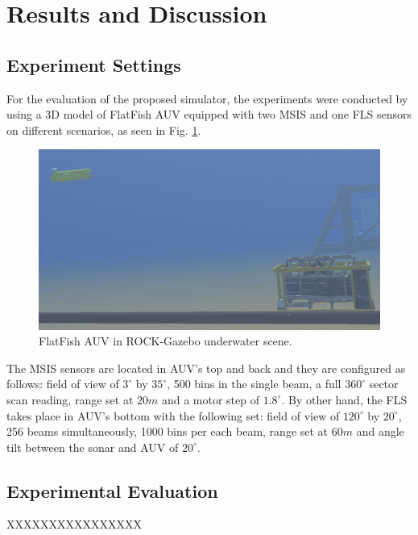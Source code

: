 \documentclass[final,5p,times]{elsarticle}
\begin{document}
\section{Results and Discussion}
\label{results}

\subsection{Experiment Settings}

For the evaluation of the proposed simulator, the experiments were conducted by using a 3D model of FlatFish AUV equipped with two MSIS and one FLS sensors on different scenarios, as seen in Fig. \ref{fig:uwscene}.

\begin{figure}[!h]
    \includegraphics[width=\columnwidth]{figs/uwscene2}
    \centering
    \captionsetup{justification=centering}
    \caption{FlatFish AUV in ROCK-Gazebo underwater scene.}
    \label{fig:uwscene}
\end{figure}

The MSIS sensors are located in AUV's top and back and they are configured as follows: field of view of $3^{\circ}$ by $35^{\circ}$, 500 bins in the single beam, a full $360^{\circ}$ sector scan reading, range set at $20m$ and a motor step of $1.8^{\circ}$. By other hand, the FLS takes place in AUV's bottom with the following set: field of view of $120^{\circ}$ by $20^{\circ}$, 256 beams simultaneously, 1000 bins per each beam, range set at $60m$ and angle tilt between the sonar and AUV of $20^{\circ}$.

\subsection{Experimental Evaluation}

XXXXXXXXXXXXXXXX
\end{document}
